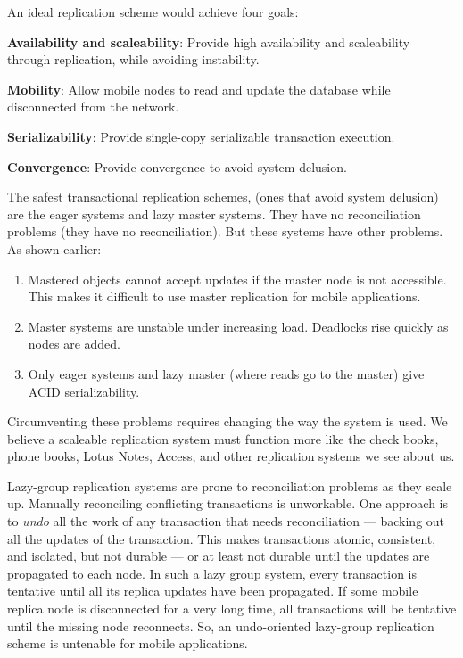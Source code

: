 \documentclass[a4paper,12pt,twoside,openright]{article}
\begin{document}
An ideal replication scheme would achieve four goals:

\textbf{Availability and scaleability}: Provide high availability and
scaleability through replication, while avoiding instability.

\textbf{Mobility}: Allow mobile nodes to read and update the database
while disconnected from the network.

\textbf{Serializability}: Provide single-copy serializable transaction
execution.

\textbf{Convergence}: Provide convergence to avoid system delusion.

The safest transactional replication schemes, (ones that avoid system
delusion) are the eager systems and lazy master systems. They have no
reconciliation problems (they have no reconciliation). But these systems
have other problems. As shown earlier:

\begin{enumerate}
\def\labelenumi{\arabic{enumi}.}
\item
  Mastered objects cannot accept updates if the master node is not
  accessible. This makes it difficult to use master replication for
  mobile applications.
\item
  Master systems are unstable under increasing load. Deadlocks rise
  quickly as nodes are added.
\item
  Only eager systems and lazy master (where reads go to the master) give
  ACID serializability.
\end{enumerate}

Circumventing these problems requires changing the way the system is
used. We believe a scaleable replication system must function more like
the check books, phone books, Lotus Notes, Access, and other replication
systems we see about us.

Lazy-group replication systems are prone to reconciliation problems as
they scale up. Manually reconciling conflicting transactions is
unworkable. One approach is to \emph{undo} all the work of any
transaction that needs reconciliation --- backing out all the updates of
the transaction. This makes transactions atomic, consistent, and
isolated, but not durable --- or at least not durable until the updates
are propagated to each node. In such a lazy group system, every
transaction is tentative until all its replica updates have been
propagated. If some mobile replica node is disconnected for a very long
time, all transactions will be tentative until the missing node
reconnects. So, an undo-oriented lazy-group replication scheme is
untenable for mobile applications.
\end{document}
